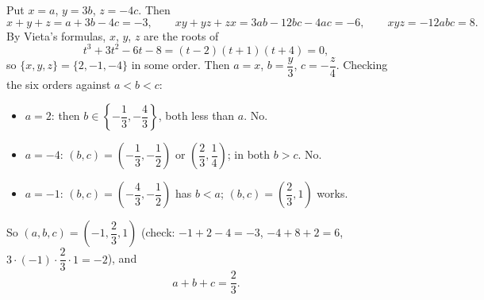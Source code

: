 Put $x=a$, $y=3b$, $z=-4c$. Then
\[
x+y+z=a+3b-4c=-3,\qquad xy+yz+zx=3ab-12bc-4ac=-6,\qquad xyz=-12abc=8 .
\]
By Vieta's formulas, $x$, $y$, $z$ are the roots of
\[
t^3+3t^2-6t-8=(t-2)(t+1)(t+4)=0,
\]
so $\{x,y,z\}=\{2,-1,-4\}$ in some order. Then $a=x$, $b=\dfrac{y}{3}$, $c=-\dfrac{z}{4}$. Checking the six orders against $a<b<c$:
\begin{itemize}
\item $a=2$: then $b\in\left\{-\dfrac{1}{3},-\dfrac{4}{3}\right\}$, both less than $a$. No.
\item $a=-4$: $(b,c)=\left(-\dfrac{1}{3},-\dfrac{1}{2}\right)$ or $\left(\dfrac{2}{3},\dfrac{1}{4}\right)$; in both $b>c$. No.
\item $a=-1$: $(b,c)=\left(-\dfrac{4}{3},-\dfrac{1}{2}\right)$ has $b<a$; $(b,c)=\left(\dfrac{2}{3},1\right)$ works.
\end{itemize}
So $(a,b,c)=\left(-1,\dfrac{2}{3},1\right)$ (check: $-1+2-4=-3$, $-4+8+2=6$, $3\cdot(-1)\cdot\dfrac{2}{3}\cdot1=-2$), and
\[
a+b+c=\boxed{\dfrac{2}{3}} .
\]
